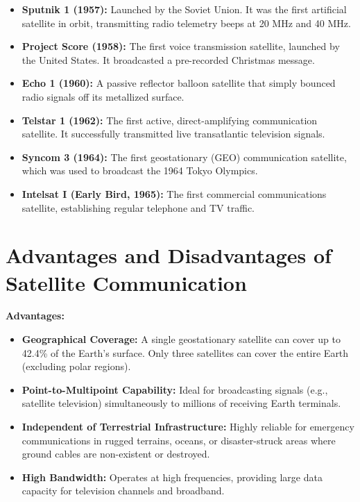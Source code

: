 \documentclass[12pt,a4paper]{article}
\begin{document}
\begin{itemize}[leftmargin=*, itemsep=3pt]
  \item \textbf{Sputnik 1 (1957):} Launched by the Soviet Union. It was the first artificial satellite in orbit, transmitting radio telemetry beeps at 20 MHz and 40 MHz.
  \item \textbf{Project Score (1958):} The first voice transmission satellite, launched by the United States. It broadcasted a pre-recorded Christmas message.
  \item \textbf{Echo 1 (1960):} A passive reflector balloon satellite that simply bounced radio signals off its metallized surface.
  \item \textbf{Telstar 1 (1962):} The first active, direct-amplifying communication satellite. It successfully transmitted live transatlantic television signals.
  \item \textbf{Syncom 3 (1964):} The first geostationary (GEO) communication satellite, which was used to broadcast the 1964 Tokyo Olympics.
  \item \textbf{Intelsat I (Early Bird, 1965):} The first commercial communications satellite, establishing regular telephone and TV traffic.
\end{itemize}

\section{Advantages and Disadvantages of Satellite Communication}

\textbf{Advantages:}
\begin{itemize}[leftmargin=*, itemsep=3pt]
  \item \textbf{Geographical Coverage:} A single geostationary satellite can cover up to 42.4\% of the Earth's surface. Only three satellites can cover the entire Earth (excluding polar regions).
  \item \textbf{Point-to-Multipoint Capability:} Ideal for broadcasting signals (e.g., satellite television) simultaneously to millions of receiving Earth terminals.
  \item \textbf{Independent of Terrestrial Infrastructure:} Highly reliable for emergency communications in rugged terrains, oceans, or disaster-struck areas where ground cables are non-existent or destroyed.
  \item \textbf{High Bandwidth:} Operates at high frequencies, providing large data capacity for television channels and broadband.
\end{itemize}
\end{document}
